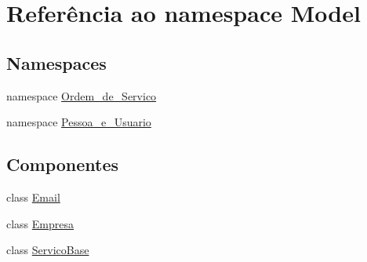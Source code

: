 \hypertarget{namespace_model}{}\section{Referência ao namespace Model}
\label{namespace_model}
\subsection*{Namespaces}
\begin{DoxyCompactItemize}
\item 
namespace \hyperlink{namespace_model_1_1_ordem__de___servico}{Ordem\+\_\+de\+\_\+\+Servico}
\item 
namespace \hyperlink{namespace_model_1_1_pessoa__e___usuario}{Pessoa\+\_\+e\+\_\+\+Usuario}
\end{DoxyCompactItemize}
\subsection*{Componentes}
\begin{DoxyCompactItemize}
\item 
class \hyperlink{class_model_1_1_email}{Email}
\item 
class \hyperlink{class_model_1_1_empresa}{Empresa}
\item 
class \hyperlink{class_model_1_1_servico_base}{Servico\+Base}
\end{DoxyCompactItemize}
